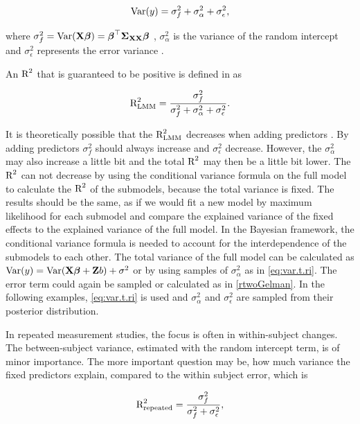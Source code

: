 \documentclass[11pt,a4paper,twoside]{book}\usepackage[]{graphicx}\usepackage[]{color}
\begin{document}
      \begin{align} 
        \operatorname{Var}(y) = \sigma_{f}^2  + \sigma_{\alpha}^2 + \sigma_{\epsilon}^2, \label{eq:var.t.ri} 
        \end{align}

where $\sigma_{f}^2 = \operatorname{Var}({\mathbf{X}} {\boldsymbol{\beta}}) = {\boldsymbol{\beta}}^\top {\boldsymbol{\Sigma}}{}_{{\mathbf{X}} {\mathbf{X}}}  {\boldsymbol{\beta}}$ , $\sigma_{\alpha}^2 $ is the variance of the random intercept and $\sigma_{\epsilon}^2$ represents the error variance \citep{Nakagawa2013}. 

An $\text{R}^2$ that is guaranteed to be positive is defined in \cite{Nakagawa2013} as

   \begin{align} 
\text{R}^2_{\text{LMM}} = \frac{\sigma_{f}^2}{\sigma_{f}^2 + \sigma_{\alpha}^2 + \sigma_{\epsilon}^2}.
\end{align}


 It is theoretically possible that the $\text{R}^2_{\text{LMM}}$ decreases when adding predictors \citep{Nakagawa2013}.  By adding predictors $\sigma_{f}^2$  should always increase and  $\sigma_{\epsilon}^2$  decrease. However, the $\sigma_{\alpha}^2$ may also increase a little bit and the total $\text{R}^2$ may then be a little bit lower. The $\text{R}^2$ can not decrease by using the conditional variance formula on the full model to calculate the $\text{R}^2$ of the submodels, because the total variance is fixed. The results should be the same, as if we would fit a new model by maximum likelihood for each submodel and  compare the explained variance of the fixed effects to the explained variance of the full model.  In the Bayesian framework, the conditional variance formula is needed to account for the interdependence of the submodels to each other. The total variance of the full model can be calculated as  $\operatorname{Var}(y) = \operatorname{Var}({\mathbf{X}} {\boldsymbol{\beta}} + {\mathbf{Z}} b) + \sigma^2$ or by using samples of $\sigma_{\alpha}^2$ as in \eqref{eq:var.t.ri}. The error term could again be sampled or calculated as in \eqref{rtwoGelman}. In the following examples, \eqref{eq:var.t.ri} is used and  $\sigma_{\alpha}^2$ and $\sigma_{\epsilon}^2$ are sampled from their posterior distribution.

In repeated measurement studies, the focus is often in within-subject changes. The between-subject variance, estimated with the random intercept term, is of minor importance. The more important question may be, how much variance the fixed predictors explain, compared to the within subject error, which is

   \begin{align} 
\text{R}^2_{\text{repeated}} = \frac{\sigma_{f}^2}{\sigma_{f}^2  + \sigma_{\epsilon}^2}, \label{rtwo.repeated}
\end{align}
\end{document}
